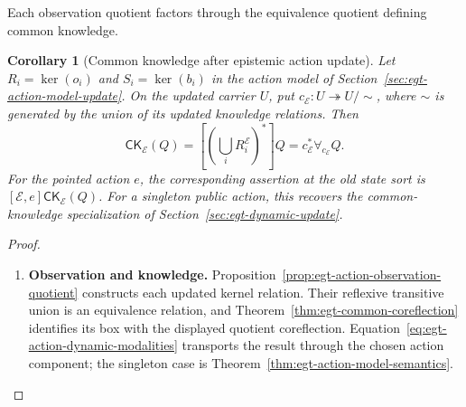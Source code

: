 \documentclass[11pt,a4paper]{article}
\numberwithin{equation}{section}
\newtheorem{corollary}[theorem]{Corollary}
\theoremstyle{definition}
\theoremstyle{remark}
\theoremstyle{plain}
\begin{document}
\noindent Each observation quotient factors through the equivalence quotient defining common knowledge.
\begin{center}
\end{center}

\begin{corollary}[Common knowledge after epistemic action update]
\label{cor:egt-action-common-knowledge}
Let $R_i=\ker(o_i)$ and $S_i=\ker(b_i)$ in the action model of
Section~\ref{sec:egt-action-model-update}. On the updated carrier $U$,
put $c_{\mathcal E}:U\twoheadrightarrow U/{\sim}$, where $\sim$ is
generated by the union of its updated knowledge relations. Then
\[
 \mathsf{CK}_{\mathcal E}(Q)
 =\left[\left(\bigcup_iR_i^{\mathcal E}\right)^*\right]Q
 =c_{\mathcal E}^*\forall_{c_{\mathcal E}}Q.
\]
For the pointed action $e$, the corresponding assertion at the old
state sort is $[\mathcal E,e]\mathsf{CK}_{\mathcal E}(Q)$.
For a singleton public action, this recovers the common-knowledge
specialization of Section~\ref{sec:egt-dynamic-update}.
\end{corollary}
\begin{proof}
\leavevmode
\begin{enumerate}[label=\textup{(\arabic*)},leftmargin=*,itemsep=4pt,topsep=3pt]
  \item \textbf{Observation and knowledge.} Proposition~\ref{prop:egt-action-observation-quotient} constructs each
updated kernel relation. Their reflexive transitive union is an
equivalence relation, and Theorem~\ref{thm:egt-common-coreflection}
identifies its box with the displayed quotient coreflection. Equation~\eqref{eq:egt-action-dynamic-modalities} transports the
result through the chosen action component; the singleton case is
Theorem~\ref{thm:egt-action-model-semantics}.
\end{enumerate}
\end{proof}
\end{document}
